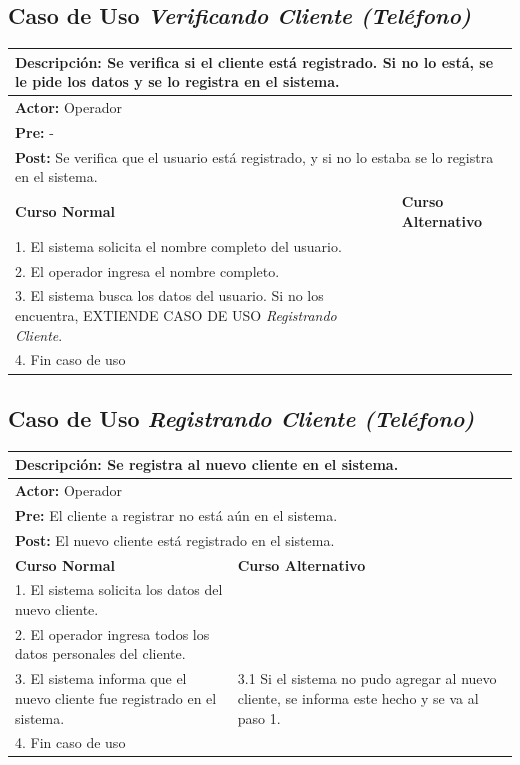 \documentclass[a4paper]{article}
\begin{document}
\subsection{Caso de Uso \textit{Verificando Cliente (Tel\'efono)}}
\begin{center}
\begin{tabular}{|p{10cm} | p{6cm}|}
\hline
\multicolumn{2}{|p{16cm}|}{\textbf{Descripci\'on:} Se verifica si el cliente est\'a registrado. Si no lo est\'a, se le pide los datos y se lo registra en el sistema.} \\
\hline
\multicolumn{2}{|l|}{\textbf{Actor:} Operador} \\
\hline
\multicolumn{2}{|l|}{\textbf{Pre:} -} \\
\hline
\multicolumn{2}{|p{14cm}|}{\textbf{Post:} Se verifica que el usuario est\'a registrado, y si no lo estaba se lo registra en el sistema.}\\
\hline
\textbf{Curso Normal}  & \textbf{Curso Alternativo} \\ \hline
1. El sistema solicita el nombre completo del usuario. & \\ \hline
2. El operador ingresa el nombre completo. & \\ \hline
3. El sistema busca los datos del usuario. Si no los encuentra, EXTIENDE CASO DE USO \textit{Registrando Cliente}. & \\ \hline
4. Fin caso de uso & \\ \hline
\end{tabular}
\end{center}

\subsection{Caso de Uso \textit{Registrando Cliente (Tel\'efono)}}
\begin{center}
\begin{tabular}{|p{10cm} | p{6cm}|}
\hline
\multicolumn{2}{|p{16cm}|}{\textbf{Descripci\'on:} Se registra al nuevo cliente en el sistema.} \\
\hline
\multicolumn{2}{|l|}{\textbf{Actor:} Operador} \\
\hline
\multicolumn{2}{|l|}{\textbf{Pre:} El cliente a registrar no est\'a a\'un en el sistema.} \\
\hline
\multicolumn{2}{|p{14cm}|}{\textbf{Post:} El nuevo cliente est\'a registrado en el sistema.}\\
\hline
\textbf{Curso Normal}  & \textbf{Curso Alternativo} \\ \hline
1. El sistema solicita los datos del nuevo cliente. & \\ \hline
2. El operador ingresa todos los datos personales del cliente. & \\ \hline
3. El sistema informa que el nuevo cliente fue registrado en el sistema. & 3.1 Si el sistema no pudo agregar al nuevo cliente, se informa este hecho y se va al paso 1. \\ \hline
4. Fin caso de uso & \\ \hline
\end{tabular}
\end{center}
\end{document}

